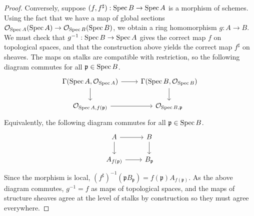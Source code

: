\begin{proof}
    Conversely, suppose \( (f, f^\sharp) : \operatorname{Spec} B \to \operatorname{Spec} A \) is a morphism of schemes.
    Using the fact that we have a map of global sections \( \mathcal O_{\operatorname{Spec} A}(\operatorname{Spec} A) \to \mathcal O_{\operatorname{Spec} B}(\operatorname{Spec} B) \), we obtain a ring homomorphism \( g : A \to B \).
    We must check that \( g^{-1} : \operatorname{Spec} B \to \operatorname{Spec} A \) gives the correct map \( f \) on topological spaces, and that the construction above yields the correct map \( f^\sharp \) on sheaves.
    The maps on stalks are compatible with restriction, so the following diagram commutes for all \( \mathfrak p \in \operatorname{Spec} B \).
\[\begin{tikzcd}
	{\Gamma(\Spec A, \mathcal O_{\Spec A})} & {\Gamma(\Spec B, \mathcal O_{\Spec B})} \\
	{\mathcal O_{\Spec A, f(\mathfrak p)}} & {\mathcal O_{\Spec B, \mathfrak p}}
	\arrow[from=1-1, to=1-2]
	\arrow[from=1-2, to=2-2]
	\arrow[from=1-1, to=2-1]
	\arrow[from=2-1, to=2-2]
\end{tikzcd}\]
    Equivalently, the following diagram commutes for all \( \mathfrak p \in \operatorname{Spec} B \).
\[\begin{tikzcd}
	A & B \\
	{A_{f(\mathfrak p)}} & {B_{\mathfrak p}}
	\arrow[from=1-1, to=1-2]
	\arrow[from=1-2, to=2-2]
	\arrow[from=1-1, to=2-1]
	\arrow[from=2-1, to=2-2]
\end{tikzcd}\]
    Since the morphism is local, \( (f^\sharp)^{-1}(\mathfrak p B_{\mathfrak p}) = f(\mathfrak p) A_{f(\mathfrak p)} \).
    As the above diagram commutes, \( g^{-1} = f \) as maps of topological spaces, and the maps of structure sheaves agree at the level of stalks by construction so they must agree everywhere.
\end{proof}

